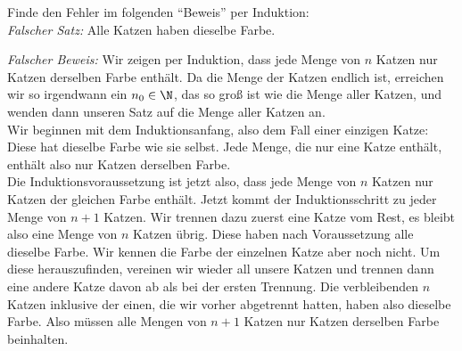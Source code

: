 \begin{prob}
  Finde den Fehler im folgenden \enquote{Beweis} per Induktion: \\
  \textit{Falscher Satz:} Alle Katzen haben dieselbe Farbe.

  \textit{Falscher Beweis:} Wir zeigen per Induktion, dass jede Menge von $n$
  Katzen nur Katzen derselben Farbe enthält. Da die Menge der Katzen endlich
  ist, erreichen wir so irgendwann ein $n_0 \in \N$, das so groß ist wie die
  Menge aller Katzen, und wenden dann unseren Satz auf die Menge aller Katzen
  an.\\
  Wir beginnen mit dem Induktionsanfang, also dem Fall einer einzigen Katze:
  Diese hat dieselbe Farbe wie sie selbst. Jede Menge, die nur eine Katze
  enthält, enthält also nur Katzen derselben Farbe. \\
  Die Induktionsvoraussetzung ist jetzt also, dass jede Menge von $n$ Katzen nur
  Katzen der gleichen Farbe enthält. Jetzt kommt der Induktionsschritt zu jeder
  Menge von $n + 1$ Katzen. Wir trennen dazu zuerst eine Katze vom Rest, es
  bleibt also eine Menge von $n$ Katzen übrig. Diese haben nach Voraussetzung
  alle dieselbe Farbe. Wir kennen die Farbe der einzelnen Katze aber noch nicht.
  Um diese herauszufinden, vereinen wir wieder all unsere Katzen und trennen
  dann eine andere Katze davon ab als bei der ersten Trennung. Die verbleibenden
  $n$ Katzen inklusive der einen, die wir vorher abgetrennt hatten, haben also
  dieselbe Farbe. Also müssen alle Mengen von $n + 1$ Katzen nur Katzen
  derselben Farbe beinhalten.
\end{prob}

